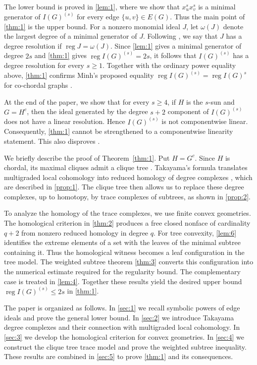 \documentclass[11pt]{amsart}
\theoremstyle{definition}
\newcommand{\reg}{\operatorname{reg}}
\begin{document}
The lower bound is proved in \cref{lem:1}, where we show that $x_u^s x_v^s$ is a minimal generator of $I(G)^{(s)}$ for every edge $\{u,v\}\in E(G)$. Thus the main point of \cref{thm:1} is the upper bound. For a nonzero monomial ideal $J$, let $\omega(J)$ denote the largest degree of a minimal generator of $J$. Following \cite{Namiq}, we say that $J$ has a degree resolution if $\reg J=\omega(J)$. Since \cref{lem:1} gives a minimal generator of degree $2s$ and \cref{thm:1} gives $\reg I(G)^{(s)}=2s$, it follows that $I(G)^{(s)}$ has a degree resolution for every $s\ge1$. Together with the ordinary power equality above, \cref{thm:1} confirms Minh's proposed equality $\reg I(G)^{(s)}=\reg I(G)^s$ for co-chordal graphs \cite{GuHaORourkeSkelton,MinhVuSurvey}.

At the end of the paper, we show that for every $s\ge4$, if $H$ is the $s$-sun and $G=H^c$, then the ideal generated by the degree $s+2$ component of $I(G)^{(s)}$ does not have a linear resolution. Hence $I(G)^{(s)}$ is not componentwise linear. Consequently, \cref{thm:1} cannot be strengthened to a componentwise linearity statement. This also disproves \cite[]{FMR}.

We briefly describe the proof of Theorem~\ref{thm:1}. Put $H=G^c$. Since $H$ is chordal, its maximal cliques admit a clique tree \cite{BlairPeyton}. Takayama's formula translates multigraded local cohomology into reduced homology of degree complexes \cite{CHHKTT,Takayama}, which are described in \cref{prop:1}. The clique tree then allows us to replace these degree complexes, up to homotopy, by trace complexes of subtrees, as shown in \cref{prop:2}.

To analyze the homology of the trace complexes, we use finite convex geometries. The homological criterion in \cref{thm:2} produces a free closed nonface of cardinality $q+2$ from nonzero reduced homology in degree $q$. For tree convexity, \cref{lem:6} identifies the extreme elements of a set with the leaves of the minimal subtree containing it. Thus the homological witness becomes a leaf configuration in the tree model. The weighted subtree theorem \cref{thm:3} converts this configuration into the numerical estimate required for the regularity bound. The complementary case is treated in \cref{lem:4}. Together these results yield the desired upper bound $\reg I(G)^{(s)}\le2s$ in \cref{thm:1}.

The paper is organized as follows. In \cref{sec:1} we recall symbolic powers of edge ideals and prove the general lower bound. In \cref{sec:2} we introduce Takayama degree complexes and their connection with multigraded local cohomology. In \cref{sec:3} we develop the homological criterion for convex geometries. In \cref{sec:4} we construct the clique tree trace model and prove the weighted subtree inequality. These results are combined in \cref{sec:5} to prove \cref{thm:1} and its consequences.
\end{document}
